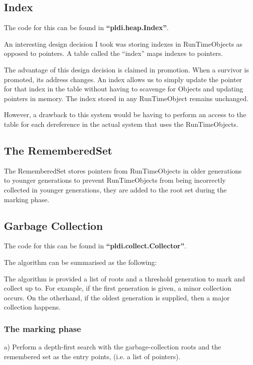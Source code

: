 \documentclass{article}
\begin{document}
\subsection{Index}

The code for this can be found in \textbf{``pldi.heap.Index''}.

An interesting design decision I took was storing indexes in RunTimeObjects as opposed to pointers. A table called the ``index'' maps indexes to pointers.

The advantage of this design decision is claimed in promotion. When a survivor is promoted, its address changes. An index allows us to simply update the pointer for that index in the table without having to scavenge for Objects and updating pointers in memory. The index stored in any RunTimeObject remains unchanged.

However, a drawback to this system would be having to perform an access to the table for each dereference in the actual system that uses the RunTimeObjects.

\subsection{The RememberedSet}

The RememberedSet stores pointers from RunTimeObjects in older generations to younger generations to prevent RunTimeObjects from being incorrectly collected in younger generations, they are added to the root set during the marking phase. 

\subsection{Garbage Collection}

The code for this can be found in \textbf{``pldi.collect.Collector''}.

The algorithm can be summarised as the following:

The algorithm is provided a list of roots and a threshold generation to mark and collect up to. For example, if the first generation is given, a minor collection occurs. On the otherhand, if the oldest generation is supplied, then a major collection happens. 

\subsubsection{The marking phase}

a) Perform a depth-first search with the garbage-collection roots and the remembered set as the entry points, (i.e. a list of pointers).
\end{document}
